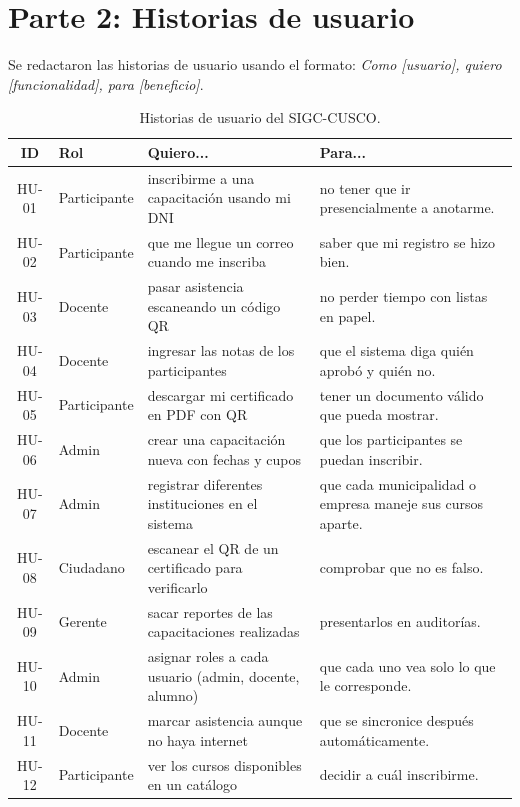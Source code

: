 \section{Parte 2: Historias de usuario}

Se redactaron las historias de usuario usando el formato: \textit{Como [usuario], quiero [funcionalidad], para [beneficio]}.

\begin{table}[htbp]
\centering
\small
\renewcommand{\arraystretch}{1.15}
\begin{tabularx}{\textwidth}{c p{2.2cm} X X}
\toprule
\textbf{ID} & \textbf{Rol} & \textbf{Quiero...} & \textbf{Para...} \\
\midrule
HU-01 & Participante & inscribirme a una capacitación usando mi DNI & no tener que ir presencialmente a anotarme. \\
\midrule
HU-02 & Participante & que me llegue un correo cuando me inscriba & saber que mi registro se hizo bien. \\
\midrule
HU-03 & Docente & pasar asistencia escaneando un código QR & no perder tiempo con listas en papel. \\
\midrule
HU-04 & Docente & ingresar las notas de los participantes & que el sistema diga quién aprobó y quién no. \\
\midrule
HU-05 & Participante & descargar mi certificado en PDF con QR & tener un documento válido que pueda mostrar. \\
\midrule
HU-06 & Admin & crear una capacitación nueva con fechas y cupos & que los participantes se puedan inscribir. \\
\midrule
HU-07 & Admin & registrar diferentes instituciones en el sistema & que cada municipalidad o empresa maneje sus cursos aparte. \\
\midrule
HU-08 & Ciudadano & escanear el QR de un certificado para verificarlo & comprobar que no es falso. \\
\midrule
HU-09 & Gerente & sacar reportes de las capacitaciones realizadas & presentarlos en auditorías. \\
\midrule
HU-10 & Admin & asignar roles a cada usuario (admin, docente, alumno) & que cada uno vea solo lo que le corresponde. \\
\midrule
HU-11 & Docente & marcar asistencia aunque no haya internet & que se sincronice después automáticamente. \\
\midrule
HU-12 & Participante & ver los cursos disponibles en un catálogo & decidir a cuál inscribirme. \\
\bottomrule
\end{tabularx}
\caption{Historias de usuario del SIGC-CUSCO.}
\label{tab:historias}
\end{table}
